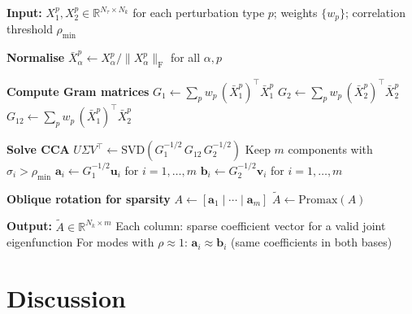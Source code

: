 \documentclass[a4paper,11pt]{article}
\newcommand{\va}{\bm{a}}
\newcommand{\vb}{\bm{b}}
\newcommand{\vu}{\bm{u}}
\newcommand{\vv}{\bm{v}}
\newcommand{\Xb}[2]{X_{#1}^{#2}}
\newcommand{\Xn}[2]{\bar{X}_{#1}^{#2}}
\newcommand{\Gb}[1]{G_{#1}}
\newcommand{\frob}[1]{\lVert #1 \rVert_{\mathrm{F}}}
\newcommand{\Nk}{N_k}
\newcommand{\Nt}{N_\tau}
\theoremstyle{plain}
\begin{document}
\begin{algorithm}[H]
\caption{CCA-based sparse joint eigenfunction method}
\label{alg:pipeline}
\begin{algorithmic}[1]
\Statex \textbf{Input:} $\Xb{1}{p}, \Xb{2}{p} \in \mathbb{R}^{\Nt \times \Nk}$ for each perturbation type $p$; weights $\{w_p\}$; correlation threshold $\rho_{\min}$
\Statex

\State \textbf{Normalise} \Comment{\S\ref{sec:gram}}
\State \quad $\Xn{\alpha}{p} \gets \Xb{\alpha}{p} / \frob{\Xb{\alpha}{p}}$ for all $\alpha, p$
\Statex

\State \textbf{Compute Gram matrices} \Comment{\S\ref{sec:gram}}
\State \quad $\Gb{1} \gets \sum_p w_p \, (\Xn{1}{p})^\top \Xn{1}{p}$ \Comment{$(\Nk, \Nk)$}
\State \quad $\Gb{2} \gets \sum_p w_p \, (\Xn{2}{p})^\top \Xn{2}{p}$
\State \quad $\Gb{12} \gets \sum_p w_p \, (\Xn{1}{p})^\top \Xn{2}{p}$
\Statex

\State \textbf{Solve CCA} \Comment{\S\ref{sec:cca-def}}
\State \quad $U \Sigma V^\top \gets \mathrm{SVD}(\Gb{1}^{-1/2} \, \Gb{12} \, \Gb{2}^{-1/2})$
\State \quad Keep $m$ components with $\sigma_i > \rho_{\min}$
\State \quad $\va_i \gets \Gb{1}^{-1/2} \vu_i$ for $i = 1, \ldots, m$ 
\State \quad $\vb_i \gets \Gb{2}^{-1/2} \vv_i$ for $i = 1, \ldots, m$ 
\Statex

\State \textbf{Oblique rotation for sparsity} \Comment{\S\ref{sec:sparsity}}
\State \quad $A \gets [\va_1 \mid \cdots \mid \va_m]$ \Comment{$(\Nk, m)$}
\State \quad $\tilde{A} \gets \mathrm{Promax}(A)$ 
\Statex

\Statex \textbf{Output:} $\tilde{A} \in \mathbb{R}^{\Nk \times m}$
\Statex \quad Each column: sparse coefficient vector for a valid joint eigenfunction
\Statex \quad For modes with $\rho \approx 1$: $\va_i \approx \vb_i$ (same coefficients in both bases)
\end{algorithmic}
\end{algorithm}

\section{Discussion}
\label{sec:discussion}
\end{document}
